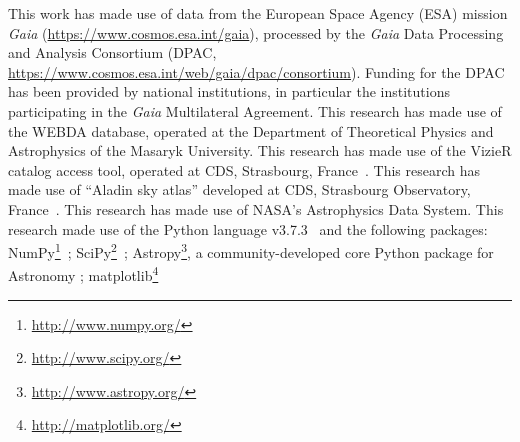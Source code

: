 \documentclass{aa}
\begin{document}
\begin{acknowledgements}
This work has made use of data from the European Space Agency (ESA) mission
{\it Gaia} (\url{https://www.cosmos.esa.int/gaia}), processed by the {\it Gaia}
Data Processing and Analysis Consortium (DPAC,
\url{https://www.cosmos.esa.int/web/gaia/dpac/consortium}). Funding for the DPAC
has been provided by national institutions, in particular the institutions
participating in the {\it Gaia} Multilateral Agreement.
%
This research has made use of the WEBDA database, operated at the Department of
Theoretical Physics and Astrophysics of the Masaryk University.
%
This research has made use of the VizieR catalog access tool, operated at CDS,
Strasbourg, France~\citep{Ochsenbein_2000}.
%
This research has made use of ``Aladin sky atlas'' developed at
CDS, Strasbourg Observatory, France~\citep{Bonnarel2000,Boch2014}.
%
This research has made use of NASA's Astrophysics Data System.
%
This research made use of the Python language v3.7.3~\citep{vanRossum_1995}
and the following packages:
NumPy\footnote{\url{http://www.numpy.org/}}~\citep{vanDerWalt_2011};
SciPy\footnote{\url{http://www.scipy.org/}}~\citep{Jones_2001};
Astropy\footnote{\url{http://www.astropy.org/}}, a community-developed core
Python package for Astronomy \citep{Astropy_2013};
matplotlib\footnote{\url{http://matplotlib.org/}}~\citep{hunter_2007}
\end{acknowledgements}










\end{document}
